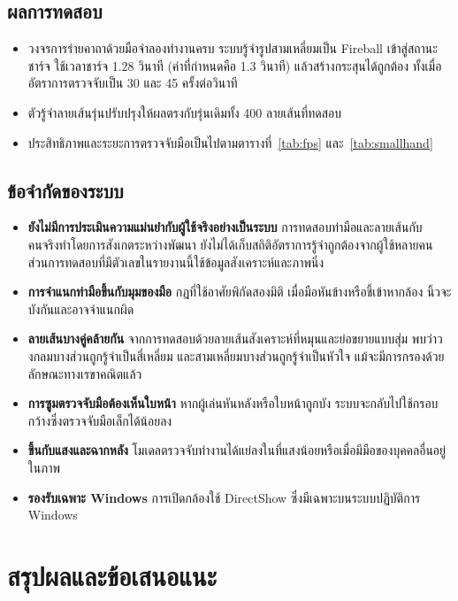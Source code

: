 \documentclass[12pt,a4paper]{report}
\begin{document}
\section{ผลการทดสอบ}
\begin{itemize}[leftmargin=2cm]
  \item วงจรการร่ายคาถาด้วยมือจำลองทำงานครบ ระบบรู้จำรูปสามเหลี่ยมเป็น Fireball เข้าสู่สถานะชาร์จ
        ใช้เวลาชาร์จ 1.28 วินาที (ค่าที่กำหนดคือ 1.3 วินาที) แล้วสร้างกระสุนได้ถูกต้อง ทั้งเมื่ออัตราการตรวจจับเป็น 30 และ 45 ครั้งต่อวินาที
  \item ตัวรู้จำลายเส้นรุ่นปรับปรุงให้ผลตรงกับรุ่นเดิมทั้ง 400 ลายเส้นที่ทดสอบ
  \item ประสิทธิภาพและระยะการตรวจจับมือเป็นไปตามตารางที่~\ref{tab:fps} และ~\ref{tab:smallhand}
\end{itemize}

\section{ข้อจำกัดของระบบ}
\begin{itemize}[leftmargin=2cm]
  \item \textbf{ยังไม่มีการประเมินความแม่นยำกับผู้ใช้จริงอย่างเป็นระบบ} การทดสอบท่ามือและลายเส้นกับคนจริงทำโดยการสังเกตระหว่างพัฒนา
        ยังไม่ได้เก็บสถิติอัตราการรู้จำถูกต้องจากผู้ใช้หลายคน ส่วนการทดสอบที่มีตัวเลขในรายงานนี้ใช้ข้อมูลสังเคราะห์และภาพนิ่ง
  \item \textbf{การจำแนกท่ามือขึ้นกับมุมของมือ} กฎที่ใช้อาศัยพิกัดสองมิติ เมื่อมือหันข้างหรือชี้เข้าหากล้อง นิ้วจะบังกันและอาจจำแนกผิด
  \item \textbf{ลายเส้นบางคู่คล้ายกัน} จากการทดสอบด้วยลายเส้นสังเคราะห์ที่หมุนและย่อขยายแบบสุ่ม พบว่าวงกลมบางส่วนถูกรู้จำเป็นสี่เหลี่ยม
        และสามเหลี่ยมบางส่วนถูกรู้จำเป็นหัวใจ แม้จะมีการกรองด้วยลักษณะทางเรขาคณิตแล้ว
  \item \textbf{การซูมตรวจจับมือต้องเห็นใบหน้า} หากผู้เล่นหันหลังหรือใบหน้าถูกบัง ระบบจะกลับไปใช้กรอบกว้างซึ่งตรวจจับมือเล็กได้น้อยลง
  \item \textbf{ขึ้นกับแสงและฉากหลัง} โมเดลตรวจจับทำงานได้แย่ลงในที่แสงน้อยหรือเมื่อมีมือของบุคคลอื่นอยู่ในภาพ
  \item \textbf{รองรับเฉพาะ Windows} การเปิดกล้องใช้ DirectShow ซึ่งมีเฉพาะบนระบบปฏิบัติการ Windows
\end{itemize}

\chapter{สรุปผลและข้อเสนอแนะ}
\end{document}
